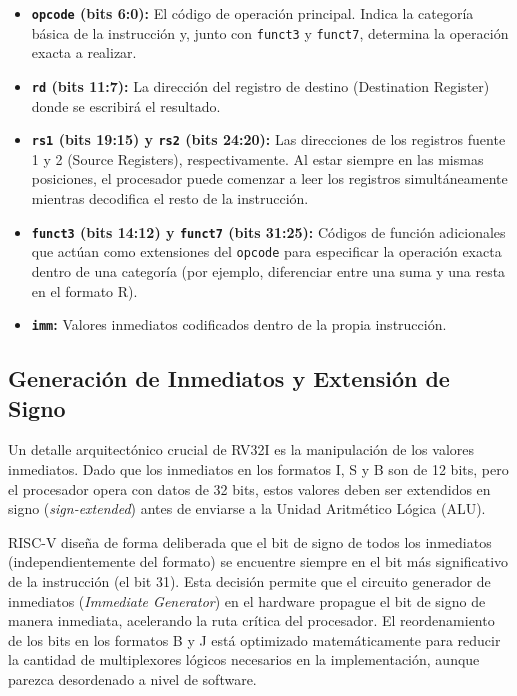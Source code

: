 \begin{itemize}
    \item \textbf{\texttt{opcode} (bits 6:0):} El código de operación principal. Indica la categoría básica de la instrucción y, junto con \texttt{funct3} y \texttt{funct7}, determina la operación exacta a realizar.
    \item \textbf{\texttt{rd} (bits 11:7):} La dirección del registro de destino (Destination Register) donde se escribirá el resultado.
    \item \textbf{\texttt{rs1} (bits 19:15) y \texttt{rs2} (bits 24:20):} Las direcciones de los registros fuente 1 y 2 (Source Registers), respectivamente. Al estar siempre en las mismas posiciones, el procesador puede comenzar a leer los registros simultáneamente mientras decodifica el resto de la instrucción.
    \item \textbf{\texttt{funct3} (bits 14:12) y \texttt{funct7} (bits 31:25):} Códigos de función adicionales que actúan como extensiones del \texttt{opcode} para especificar la operación exacta dentro de una categoría (por ejemplo, diferenciar entre una suma y una resta en el formato R).
    \item \textbf{\texttt{imm}:} Valores inmediatos codificados dentro de la propia instrucción. 
\end{itemize}

\subsection{Generación de Inmediatos y Extensión de Signo}
Un detalle arquitectónico crucial de RV32I es la manipulación de los valores inmediatos. Dado que los inmediatos en los formatos I, S y B son de 12 bits, pero el procesador opera con datos de 32 bits, estos valores deben ser extendidos en signo (\textit{sign-extended}) antes de enviarse a la Unidad Aritmético Lógica (ALU). 

RISC-V diseña de forma deliberada que el bit de signo de todos los inmediatos (independientemente del formato) se encuentre siempre en el bit más significativo de la instrucción (el bit 31). Esta decisión permite que el circuito generador de inmediatos (\textit{Immediate Generator}) en el hardware propague el bit de signo de manera inmediata, acelerando la ruta crítica del procesador. El reordenamiento de los bits en los formatos B y J está optimizado matemáticamente para reducir la cantidad de multiplexores lógicos necesarios en la implementación, aunque parezca desordenado a nivel de software.




